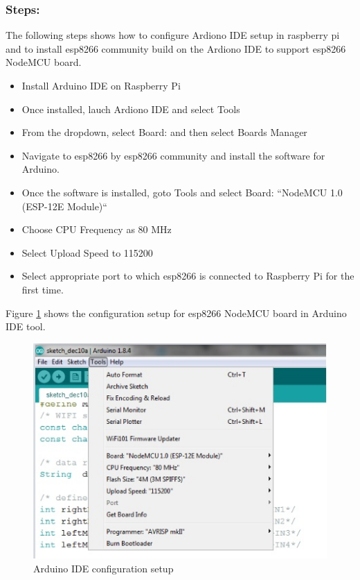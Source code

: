 \documentclass[sigconf]{acmart}
\begin{document}
\subsubsection{Steps:}
The following steps shows how to configure Ardiono IDE setup in raspberry pi and to install esp8266 community build on the Ardiono IDE to support esp8266 NodeMCU board.
\begin{itemize}

\item Install Arduino IDE on Raspberry Pi
\item Once installed, lauch Ardiono IDE and select Tools
\item From the dropdown, select Board:  and then select Boards Manager
\item Navigate to esp8266 by esp8266 community and install the
  software for Arduino.
\item Once the software is installed, goto Tools and select Board:
  ``NodeMCU 1.0 (ESP-12E Module)``
\item Choose CPU Frequency as 80 MHz
\item Select Upload Speed to 115200
\item Select appropriate port to which esp8266 is connected to
  Raspberry Pi for the first time.

\end{itemize}
Figure \ref{F:arduino} shows the configuration setup for esp8266 NodeMCU board in Arduino IDE tool.
\begin{figure}
	\includegraphics[width=1.0\columnwidth]{images/Arduino-settings.jpg}
	\caption{Arduino IDE configuration setup}\label{F:arduino}
\end{figure}
\end{document}
